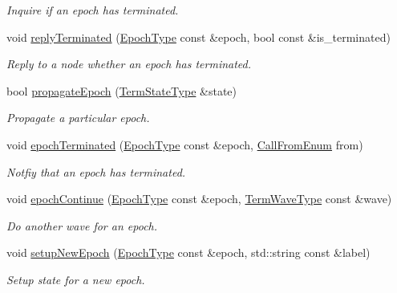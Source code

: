 \begin{DoxyCompactItemize}
\begin{DoxyCompactList}\small\item\em Inquire if an epoch has terminated. \end{DoxyCompactList}\item 
void \hyperlink{structvt_1_1term_1_1_termination_detector_a4ea359dfd9c7cbd1c8dc96f5dff78ed1}{reply\+Terminated} (\hyperlink{namespacevt_a81d11b28122d43bf9834577e4a06440f}{Epoch\+Type} const \&epoch, bool const \&is\+\_\+terminated)
\begin{DoxyCompactList}\small\item\em Reply to a node whether an epoch has terminated. \end{DoxyCompactList}\item 
bool \hyperlink{structvt_1_1term_1_1_termination_detector_a8f39f31278d42572260d09fb4c72aceb}{propagate\+Epoch} (\hyperlink{structvt_1_1term_1_1_term_action_ae4c635b69751d887666814700ed64d65}{Term\+State\+Type} \&state)
\begin{DoxyCompactList}\small\item\em Propagate a particular epoch. \end{DoxyCompactList}\item 
void \hyperlink{structvt_1_1term_1_1_termination_detector_a54a16b81d1c0717a4a7cd1adff5b146e}{epoch\+Terminated} (\hyperlink{namespacevt_a81d11b28122d43bf9834577e4a06440f}{Epoch\+Type} const \&epoch, \hyperlink{structvt_1_1term_1_1_termination_detector_a4f3ede9a87f39d86e85f92b36a6c6a30}{Call\+From\+Enum} from)
\begin{DoxyCompactList}\small\item\em Notfiy that an epoch has terminated. \end{DoxyCompactList}\item 
void \hyperlink{structvt_1_1term_1_1_termination_detector_aa26ade7d870d21b3ec9f5e97154bb847}{epoch\+Continue} (\hyperlink{namespacevt_a81d11b28122d43bf9834577e4a06440f}{Epoch\+Type} const \&epoch, \hyperlink{namespacevt_1_1term_a4af17606966b2b5a6cba523bc39095a3}{Term\+Wave\+Type} const \&wave)
\begin{DoxyCompactList}\small\item\em Do another wave for an epoch. \end{DoxyCompactList}\item 
void \hyperlink{structvt_1_1term_1_1_termination_detector_a0522eb82931331906a8be4a3571393b5}{setup\+New\+Epoch} (\hyperlink{namespacevt_a81d11b28122d43bf9834577e4a06440f}{Epoch\+Type} const \&epoch, std\+::string const \&label)
\begin{DoxyCompactList}\small\item\em Setup state for a new epoch. \end{DoxyCompactList}\item 

\end{DoxyCompactItemize}
